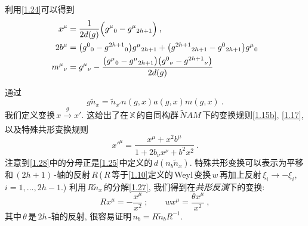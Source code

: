 利用\eqref{1.24}可以得到
\begin{subequations}
    \begin{align}
        x^{\mu}&=\frac{1}{2d(g)}\Bigl(g^{\mu}{}_{0}-g^{\mu}{}_{2h+1}\Bigr) \:, \\
        2b^{\mu}&=\bigl(g^{0}{}_{0}-g^{2h+1}{}_{0}\bigr)g^{\mu}{}_{2h+1}+
        \bigl(g^{2h+1}{}_{2h+1}-g^{0}{}_{2h+1}\bigr)g^{\mu}{}_{0} \\
        m^{\mu}{}_{\nu}&=g^{\mu}{}_{\nu}-\frac{\bigl(g^{\mu}{}_{0}-g^{\mu}{}_{2h+1}\bigr)\bigl(g^{0}{}_{\nu}-g^{2h+1}{}_{\nu}\bigr)}{2d(g)}
    \end{align} \label{1.26}
\end{subequations}

通过
\begin{equation}
    g\tilde{n}_{x} =\tilde{n}_{x'} n(g,x)a(g,x)m(g,x) \:. \label{1.27}
\end{equation}
我们定义变换$\,x\xrightarrow[]{g}x'$. 这给出了在$\,\mathbb{X}\,$的自同构群$\,\tilde{N}AM\,$下的变换规则\eqref{1.15b}, \eqref{1.17}, 以及特殊共形变换规则
\begin{equation}
    x'^{\mu} = \frac{x^{\mu}+x^{2}b^{\mu}}{1+2b_{\nu}x^{\nu}+b^{2}x^{2}} \:. \label{1.28}
\end{equation}
注意到\eqref{1.28}中的分母正是\eqref{1.25}中定义的$\,d(n_{b}\tilde{n}_{x})$. 特殊共形变换可以表示为平移和$\,(2h{+}1)\,$-轴的反射$\,R\,$($\,R\,$等于\eqref{1.10}定义的\,Weyl\,变换$\,w\,$再加上反射$\,\xi_{i}\to-\xi_{i}$, $i=1,\ldots,2h-1$.) 利用$\,R\tilde{n}_{x}\,$的分解\eqref{1.27}, 我们得到在{\it 共形反演}下的变换:
\begin{equation}
    Rx^{\mu}=-\frac{x^{\mu}}{x^{2}} \: ;\qquad 
    wx^{\mu} = \frac{\theta x^{\mu}}{x^{2}} \:,
\end{equation}
其中$\,\theta\,$是$\,2h\,$-轴的反射, 很容易证明$\,n_{b}=R\tilde{n}_{b}R^{-1}$.

